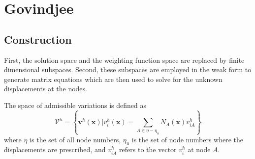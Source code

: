 \hypertarget{govindjee}{%
\section{Govindjee}\label{govindjee}}

\hypertarget{construction}{%
\subsection{Construction}\label{construction}}

First, the solution space and the weighting function space are replaced
by finite dimensional subspaces. Second, these subspaces are employed in
the weak form to generate matrix equations which are then used to solve
for the unknown displacements at the nodes.

The space of admissible variations is defined as \[
\mathcal{V}^{h}=\left\{\boldsymbol{v}^{h}(\boldsymbol{x}) | v_{i}^{h}(\boldsymbol{x})=\sum_{A \in \eta-\eta_{u}} N_{A}(\boldsymbol{x}) v_{i A}^{h}\right\}
\] where \(\eta\) is the set of all node numbers, \(\eta_{u}\) is the
set of node numbers where the displacements are prescribed, and
\(v_{i A}^{h}\) refers to the vector \(v_{i}^{h}\) at node \(A .\)

